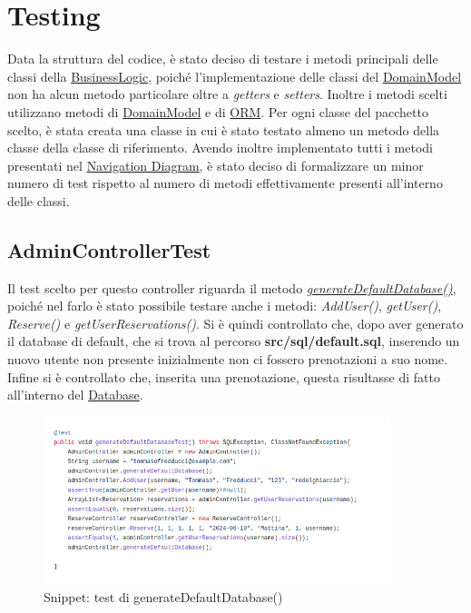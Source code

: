 \documentclass{article}
\begin{document}
{\section{Testing}\label{sec:testing}
    Data la struttura del codice, è stato deciso di testare i metodi principali delle classi della \hyperref[subsec:BusinessLogic]{BusinessLogic}, poiché l'implementazione delle classi del \hyperref[subsec:domainmodel]{DomainModel} non ha alcun metodo particolare oltre a \textit{getters} e \textit{setters}. Inoltre i metodi scelti utilizzano metodi di \hyperref[subsec:domainmodel]{DomainModel} e di \hyperref[subsec:ORM]{ORM}. Per ogni classe del pacchetto scelto, è stata creata una classe in cui è stato testato almeno un metodo della classe della classe di riferimento. Avendo inoltre implementato tutti i metodi presentati nel \hyperref[subsec:navigation-diagram]{Navigation Diagram}, è stato deciso di formalizzare un minor numero di test rispetto al numero di metodi effettivamente presenti all'interno delle classi.
\subsection{AdminControllerTest}\label{subsec:admincontrollertest}
 Il test scelto per questo controller riguarda il metodo \hyperref[fig:snippetadmindao]{\textit{generateDefaultDatabase()}}, poiché nel farlo è stato possibile testare anche i metodi: \textit{AddUser()}, \textit{getUser()}, \textit{Reserve()} e \textit{getUserReservations()}. Si è quindi controllato che, dopo aver generato il database di default, che si trova al percorso \textbf{src/sql/default.sql}, inserendo un nuovo utente non presente inizialmente non ci fossero prenotazioni a suo nome. Infine si è controllato che, inserita una prenotazione, questa risultasse di fatto all'interno del \hyperref[subsec:Database]{Database}.
\begin{figure}[H]
                \centering
                \includegraphics[width=0.9\textwidth]{Images/Snippets/TestAdminController.png}
                \captionsetup{labelformat=empty,labelsep=none}
                \caption{Snippet: test di generateDefaultDatabase()}
                \label{fig:Admincontrollertestsnippets}
            \end{figure}

}
\end{document}
